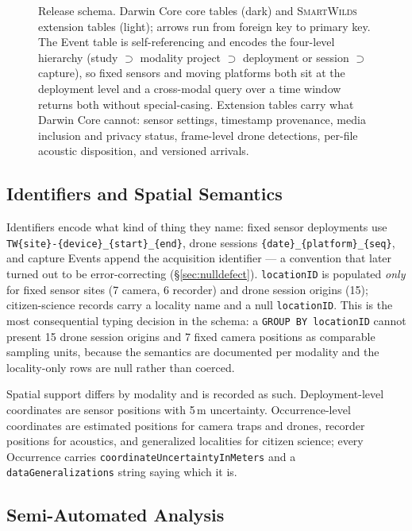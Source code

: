 \documentclass[sigconf]{acmart}
\newcommand{\smartwilds}{\textsc{SmartWilds}\xspace}
\begin{document}
\begin{figure}[t]
    \centering
    \resizebox{\linewidth}{!}{}
    \caption{Release schema. Darwin Core core tables (dark) and
    \smartwilds extension tables (light); arrows run from foreign key to
    primary key. The Event table is self-referencing and encodes the
    four-level hierarchy (study $\supset$ modality project $\supset$
    deployment or session $\supset$ capture), so fixed sensors and moving
    platforms both sit at the deployment level and a cross-modal query
    over a time window returns both without special-casing. Extension
    tables carry what Darwin Core cannot: sensor settings, timestamp
    provenance, media inclusion and privacy status, frame-level drone
    detections, per-file acoustic disposition, and versioned arrivals.}
    \label{fig:hierarchy}
\end{figure}

\subsection{Identifiers and Spatial Semantics}
\label{sec:identifiers}

Identifiers encode what kind of thing they name: fixed sensor
deployments use \texttt{TW\{site\}-\{device\}\_\{start\}\_\{end\}},
drone sessions \texttt{\{date\}\_\{platform\}\_\{seq\}}, and capture
Events append the acquisition identifier --- a convention that later
turned out to be error-correcting (\S\ref{sec:nulldefect}).
\texttt{locationID} is populated \emph{only} for fixed sensor sites
(7 camera, 6 recorder) and drone session origins (15); citizen-science
records carry a locality name and a null \texttt{locationID}. This is the most consequential typing decision in
the schema: a \texttt{GROUP BY locationID} cannot present 15 drone
session origins and 7 fixed camera positions as comparable sampling
units, because the semantics are documented per modality and the
locality-only rows are null rather than coerced.

Spatial support differs by modality and is recorded as such.
Deployment-level coordinates are sensor positions with 5\,m uncertainty.
Occurrence-level coordinates are estimated positions for camera traps
and drones, recorder positions for acoustics, and generalized localities
for citizen science; every Occurrence carries
\texttt{coordinateUncertaintyInMeters} and a
\texttt{dataGeneralizations} string saying which it is.

\subsection{Semi-Automated Analysis}
\label{sec:provenance}
\end{document}
